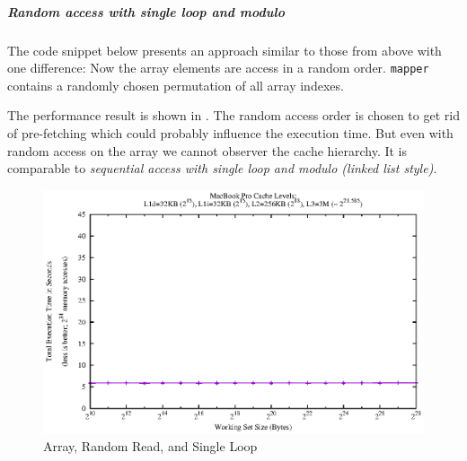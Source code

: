 \hypertarget{random-access-with-single-loop-and-modulo}{\subparagraph{Random
access with single loop and
modulo}\label{random-access-with-single-loop-and-modulo}}

The code snippet below presents an approach similar to those from above
with one difference: Now the array elements are access in a random
order. \texttt{mapper} contains a randomly chosen permutation of all
array indexes.

\begin{Shaded}
\end{Shaded}

The performance result is shown in . The random access order is chosen
to get rid of pre-fetching which could probably influence the execution
time. But even with random access on the array we cannot observer the
cache hierarchy. It is comparable to \emph{sequential access with single
loop and modulo (linked list style)}.

\begin{figure}[htbp]
\centering
\includegraphics{appendix/plots-cache-measurements/plot-array-modulo-rand}
\caption{Array, Random Read, and Single Loop}
\label{app:arr-randread-sl}
\end{figure}

